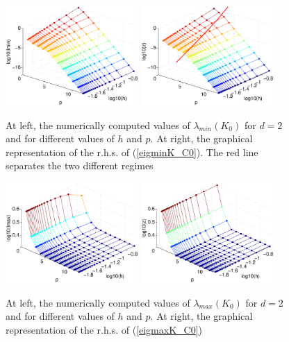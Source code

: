 \documentclass[11pt]{article}
\begin{document}
\begin{figure}
\begin{center}
\includegraphics[width=0.45\textwidth]{Images/iga0_eigK2min.eps}\quad
\includegraphics[width=0.45\textwidth]{Images/iga0_eigK2smin.eps}
\end{center}
\caption{At left, the numerically computed values of
$\lambda_{min}(K_0)$ for $d=2$ and
for different values of $h$ and $p$. At right,
the graphical representation of the r.h.s. of (\ref{eigminK_C0}). The red line
separates the two different regimes}
\label{fig:stiffmin-iga0d2}
\end{figure}

\begin{figure}
\begin{center}
\includegraphics[width=0.45\textwidth]{Images/iga0_eigK2max.eps}\quad
\includegraphics[width=0.45\textwidth]{Images/iga0_eigK2smax.eps}
\end{center}
\caption{At left, the numerically computed values of
$\lambda_{max}(K_0)$ for $d=2$ and
for different values of $h$ and $p$. At right,
the graphical representation of the r.h.s. of (\ref{eigmaxK_C0})}
\label{fig:stiffmax-iga0d2}
\end{figure}
\end{document}
